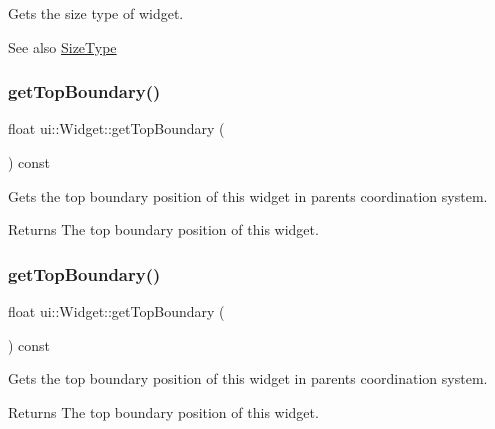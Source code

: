 Gets the size type of widget.

\begin{DoxySeeAlso}{See also}
{\ttfamily \hyperlink{classui_1_1Widget_ab7035fc10a00c756523be6bc57cf801c}{Size\+Type}} 
\end{DoxySeeAlso}
\mbox{\label{classui_1_1Widget_a5b155e9c81f0e4fb9c55e4e37e335aa9}} 
\subsubsection{\texorpdfstring{get\+Top\+Boundary()}{getTopBoundary()}\hspace{0.1cm}{\footnotesize\ttfamily [1/2]}}
{\footnotesize\ttfamily float ui\+::\+Widget\+::get\+Top\+Boundary (\begin{DoxyParamCaption}{ }\end{DoxyParamCaption}) const}

Gets the top boundary position of this widget in parent\textquotesingle{}s coordination system. \begin{DoxyReturn}{Returns}
The top boundary position of this widget. 
\end{DoxyReturn}
\mbox{\label{classui_1_1Widget_a5b155e9c81f0e4fb9c55e4e37e335aa9}} 
\subsubsection{\texorpdfstring{get\+Top\+Boundary()}{getTopBoundary()}\hspace{0.1cm}{\footnotesize\ttfamily [2/2]}}
{\footnotesize\ttfamily float ui\+::\+Widget\+::get\+Top\+Boundary (\begin{DoxyParamCaption}{ }\end{DoxyParamCaption}) const}

Gets the top boundary position of this widget in parent\textquotesingle{}s coordination system. \begin{DoxyReturn}{Returns}
The top boundary position of this widget. 
\end{DoxyReturn}
\mbox{\label{classui_1_1Widget_a3a4efd935d1f5e58f1ee1d56dd493607}} 
